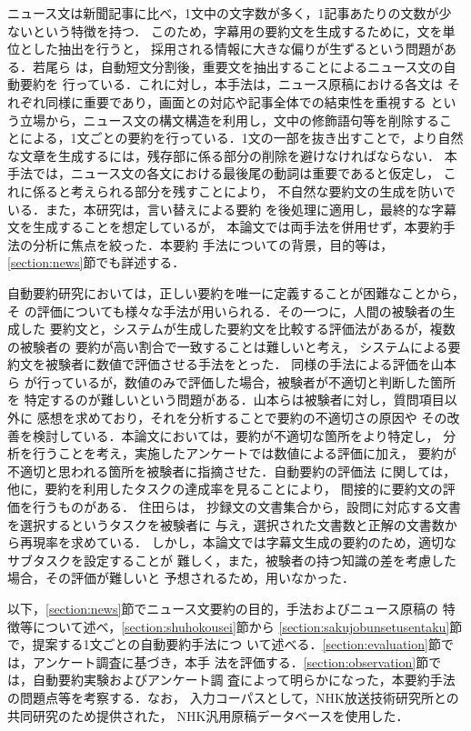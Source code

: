 ニュース文は新聞記事に比べ，1文中の文字数が多く，1記事あたりの文数が少
ないという特徴を持つ\cite{WakaoAndEharaAndMurakiAndShirai1997}．
このため，字幕用の要約文を生成するために，文を単位とした抽出を行うと，
採用される情報に大きな偏りが生ずるという問題がある．若尾ら
\cite{WakaoAndEharaAndShirai1998_7}
は，自動短文分割後，重要文を抽出することによるニュース文の自動要約を
行っている．これに対し，本手法は，ニュース原稿における各文は
それぞれ同様に重要であり，画面との対応や記事全体での結束性を重視する
という立場から，ニュース文の構文構造を利用し，文中の修飾語句等を削除するこ
とによる，1文ごとの要約を行っている．1文の一部を抜き出すことで，より自然
な文章を生成するには，残存部に係る部分の削除を避けなければならない．
本手法では，ニュース文の各文における最後尾の動詞は重要であると仮定し，
これに係ると考えられる部分を残すことにより，
不自然な要約文の生成を防いでいる．また，本研究は，言い替えによる要約
\cite{YamasakiAndMikamiAndMasuyamaAndNakagawa98}
を後処理に適用し，最終的な字幕文を生成することを想定しているが，
本論文では両手法を併用せず，本要約手法の分析に焦点を絞った．本要約
手法についての背景，目的等は，\ref{section:news}節でも詳述する．

自動要約研究においては，正しい要約を唯一に定義することが困難なことから，そ
の評価についても様々な手法が用いられる．その一つに，人間の被験者の生成した
要約文と，システムが生成した要約文を比較する評価法があるが，複数の被験者の
要約が高い割合で一致することは難しいと考え\cite{OkumuraAndNanba1998}，
システムによる要約文を被験者に数値で評価させる手法をとった．
同様の手法による評価を山本ら\cite{YamamotoAndMasuyamaAndNaito1995}
が行っているが，数値のみで評価した場合，被験者が不適切と判断した箇所を
特定するのが難しいという問題がある．山本らは被験者に対し，質問項目以外に
感想を求めており，それを分析することで要約の不適切さの原因や
その改善を検討している．本論文においては，要約が不適切な箇所をより特定し，
分析を行うことを考え，実施したアンケートでは数値による評価に加え，
要約が不適切と思われる箇所を被験者に指摘させた．自動要約の評価法
に関しては，他に，要約を利用したタスクの達成率を見ることにより，
間接的に要約文の評価を行うものがある．
住田ら\cite{SumitaAndChinoAndOnoAndMiike1995}は，
抄録文の文書集合から，設問に対応する文書を選択するというタスクを被験者に
与え，選択された文書数と正解の文書数から再現率を求めている．
しかし，本論文では字幕文生成の要約のため，適切なサブタスクを設定することが
難しく，また，被験者の持つ知識の差を考慮した場合，その評価が難しいと
予想されるため，用いなかった．

以下，\ref{section:news}節でニュース文要約の目的，手法およびニュース原稿の
特徴等について述べ，\ref{section:shuhokousei}節から
\ref{section:sakujobunsetusentaku}節で，提案する1文ごとの自動要約手法につ
いて述べる．\ref{section:evaluation}節では，アンケート調査に基づき，本手
法を評価する．\ref{section:observation}節では，自動要約実験およびアンケート調
査によって明らかになった，本要約手法の問題点等を考察する．なお，
入力コーパスとして，NHK放送技術研究所との共同研究のため提供された，
NHK汎用原稿データベースを使用した．

